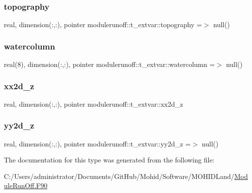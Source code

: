 \subsubsection{\texorpdfstring{topography}{topography}}
{\footnotesize\ttfamily real, dimension(\+:,\+:), pointer modulerunoff\+::t\+\_\+extvar\+::topography =$>$ null()\hspace{0.3cm}{\ttfamily [private]}}

\mbox{\label{structmodulerunoff_1_1t__extvar_a19fd76c8971ac33f249a9722eb775168}} 
\subsubsection{\texorpdfstring{watercolumn}{watercolumn}}
{\footnotesize\ttfamily real(8), dimension(\+:,\+:), pointer modulerunoff\+::t\+\_\+extvar\+::watercolumn =$>$ null()\hspace{0.3cm}{\ttfamily [private]}}

\mbox{\label{structmodulerunoff_1_1t__extvar_a863d4c27cbe79e980b8d9dee06a97306}} 
\subsubsection{\texorpdfstring{xx2d\+\_\+z}{xx2d\_z}}
{\footnotesize\ttfamily real, dimension(\+:,\+:), pointer modulerunoff\+::t\+\_\+extvar\+::xx2d\+\_\+z\hspace{0.3cm}{\ttfamily [private]}}

\mbox{\label{structmodulerunoff_1_1t__extvar_a2db65be81d98978aada4875a8b669a07}} 
\subsubsection{\texorpdfstring{yy2d\+\_\+z}{yy2d\_z}}
{\footnotesize\ttfamily real, dimension(\+:,\+:), pointer modulerunoff\+::t\+\_\+extvar\+::yy2d\+\_\+z =$>$ null()\hspace{0.3cm}{\ttfamily [private]}}



The documentation for this type was generated from the following file\+:\begin{DoxyCompactItemize}
\item 
C\+:/\+Users/administrator/\+Documents/\+Git\+Hub/\+Mohid/\+Software/\+M\+O\+H\+I\+D\+Land/\mbox{\hyperlink{_module_run_off_8_f90}{Module\+Run\+Off.\+F90}}\end{DoxyCompactItemize}
